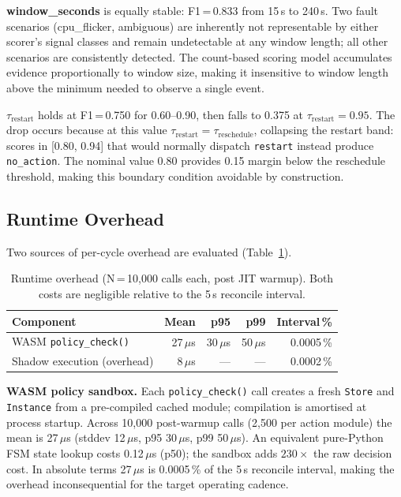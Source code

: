 \documentclass[conference]{IEEEtran}
\begin{document}
\textbf{window\_seconds} is equally stable: F1\,=\,0.833 from 15\,s to 240\,s. Two fault scenarios (cpu\_flicker, ambiguous) are inherently not representable by either scorer's signal classes and remain undetectable at any window length; all other scenarios are consistently detected. The count-based scoring model accumulates evidence proportionally to window size, making it insensitive to window length above the minimum needed to observe a single event.

\textbf{$\tau_{\mathrm{restart}}$} holds at F1\,=\,0.750 for 0.60--0.90, then falls to 0.375 at $\tau_{\mathrm{restart}} = 0.95$. The drop occurs because at this value $\tau_{\mathrm{restart}} = \tau_{\mathrm{reschedule}}$, collapsing the restart band: scores in [0.80, 0.94] that would normally dispatch \texttt{restart} instead produce \texttt{no\_action}. The nominal value 0.80 provides 0.15 margin below the reschedule threshold, making this boundary condition avoidable by construction.

\subsection{Runtime Overhead}
\label{sec:overhead}

Two sources of per-cycle overhead are evaluated (Table~\ref{tab:overhead}).

\begin{table}[t]
\caption{Runtime overhead (N\,=\,10{,}000 calls each, post JIT warmup). Both costs are negligible relative to the 5\,s reconcile interval.}
\label{tab:overhead}
\centering
\begin{tabular}{lrrrr}
\hline
Component & Mean & p95 & p99 & Interval\,\% \\
\hline
WASM \texttt{policy\_check()} & 27\,$\mu$s & 30\,$\mu$s & 50\,$\mu$s & 0.0005\,\% \\
Shadow execution (overhead) & 8\,$\mu$s & --- & --- & 0.0002\,\% \\
\hline
\end{tabular}
\end{table}

\textbf{WASM policy sandbox.} Each \texttt{policy\_check()} call creates a fresh \texttt{Store} and \texttt{Instance} from a pre-compiled cached module; compilation is amortised at process startup. Across 10{,}000 post-warmup calls (2{,}500 per action module) the mean is 27\,$\mu$s (stddev 12\,$\mu$s, p95 30\,$\mu$s, p99 50\,$\mu$s). An equivalent pure-Python FSM state lookup costs 0.12\,$\mu$s (p50); the sandbox adds $230{\times}$ the raw decision cost. In absolute terms 27\,$\mu$s is 0.0005\,\% of the 5\,s reconcile interval, making the overhead inconsequential for the target operating cadence.
\end{document}
